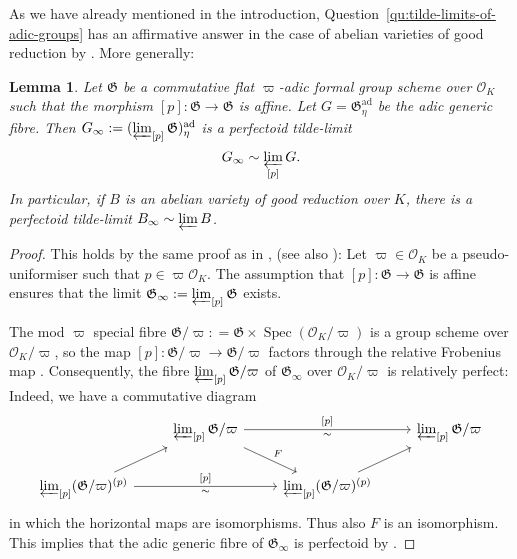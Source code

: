 \documentclass[10pt,oneside]{amsart}
\newtheorem{lemma}[theorem]{Lemma}
\theoremstyle{definition}
\newcommand{\Spec}{\operatorname{Spec}}
\newcommand{\ad}{\mathrm{ad}}
\renewcommand{\O}{\mathcal{O}}
\begin{document}
As we have already mentioned in the introduction, Question~\ref{qu:tilde-limits-of-adic-groups} has an affirmative answer in the case of abelian varieties of good reduction by \cite[Lemme~A.16]{Pilloni-Stroh}. More generally:
\begin{lemma}\label{tilde-limit exists and is perfectoid in the good reduction case}
		Let $\mathfrak G$ be a  commutative flat $\varpi$-adic formal group scheme over $\O_K$ such that the morphism $[p]:\mathfrak G\to\mathfrak G$ is affine. Let $G=\mathfrak G^{\ad}_{\eta}$ be the adic generic fibre. Then $G_\infty := (\varprojlim_{[p]}\mathfrak G)^{\ad}_\eta$ is a perfectoid tilde-limit
		\[G_\infty\sim \varprojlim_{[p]} G. \]
		In particular, if $B$ is an abelian variety of good reduction over $K$, there is a perfectoid tilde-limit $B_\infty\sim \varprojlim B$.
	\end{lemma}
\begin{proof}
	This holds by the same proof as in \cite[Lemme~A.16]{Pilloni-Stroh}, (see also \cite[Exercise 4 -- 6]{Bhatt}):
	 Let $\varpi\in\mathcal O_K$ be a pseudo-uniformiser such that $p\in \varpi\mathcal O_K$. The assumption that $[p]:\mathfrak G\to \mathfrak G$ is affine ensures that the limit $\mathfrak G_{\infty}:=\varprojlim_{[p]}\mathfrak G$ exists.
	 
	The mod $\varpi$ special fibre $\mathfrak G/\varpi: = \mathfrak G\times \Spec(\O_K/\varpi)$ is a group scheme over $\mathcal O_K/\varpi$, so the map $[p]\colon\mathfrak G/\varpi\rightarrow \mathfrak G/\varpi$ factors through the relative Frobenius map \cite[Exp. VII, 4.3]{SGA}. Consequently, the fibre $\varprojlim_{[p]}\mathfrak G/\varpi$ of $\mathfrak G_{\infty}$  over $\mathcal O_K/\varpi$ is relatively perfect: Indeed, we have a commutative diagram
	\[
\begin{tikzcd}
                                                           & {\varprojlim_{[p]}\mathfrak G/\varpi} \arrow[rd, "F"] \arrow[rr, "{[p]}","\sim"'] &                                        & {\varprojlim_{[p]}\mathfrak G/\varpi} \\
{\varprojlim_{[p]} (\mathfrak G/\varpi)^{(p)}} \arrow[ru] \arrow[rr, "{[p]}","\sim"'] &                                                          & {\varprojlim_{[p]} (\mathfrak G/\varpi)^{(p)}} \arrow[ru] &
\end{tikzcd}\]
	in which the horizontal maps are isomorphisms. Thus also $F$ is an isomorphism.
	This implies that the adic generic fibre of $\mathfrak G_{\infty}$ is perfectoid by \cite[Theorem~5.2]{perfectoid}.
\end{proof}
\end{document}
